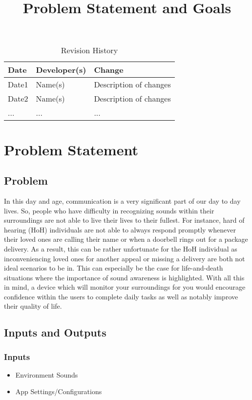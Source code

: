 \documentclass{article}
\title{Problem Statement and Goals\\\progname}
\author{\authname}
\date{}
\begin{document}
\maketitle

\begin{table}[hp]
\caption{Revision History} \label{TblRevisionHistory}
\begin{tabularx}{\textwidth}{llX}
\toprule
\textbf{Date} & \textbf{Developer(s)} & \textbf{Change}\\
\midrule
Date1 & Name(s) & Description of changes\\
Date2 & Name(s) & Description of changes\\
... & ... & ...\\
\bottomrule
\end{tabularx}
\end{table}

\section{Problem Statement}

\subsection{Problem}
In this day and age, communication is a very significant part of our day to day lives. 
So, people who have difficulty in recognizing sounds within their surroundings are not 
able to live their lives to their fullest. For instance, hard of hearing (HoH) individuals 
are not able to always respond promptly whenever their loved ones are calling their name or
when a doorbell rings out for a package delivery. As a result, this can be rather unfortunate
for the HoH individual as inconveniencing loved ones for another appeal or missing a delivery
are both not ideal scenarios to be in. This can especially be the case for life-and-death 
situations where the importance of sound awareness is highlighted. With all this in mind, 
a device which will monitor your surroundings for you would encourage confidence within 
the users to complete daily tasks as well as notably improve their quality of life.
\subsection{Inputs and Outputs}

\subsubsection {Inputs}
\begin{itemize}
    \item Environment Sounds
    \item App Settings/Configurations
\end{itemize}
\end{document}
